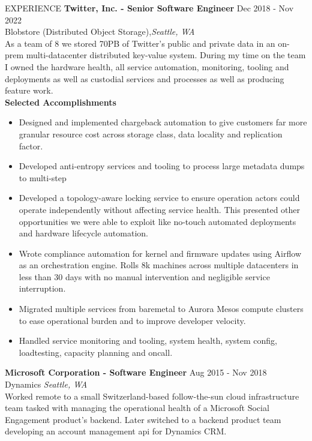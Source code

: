 \begin{rSection}{EXPERIENCE}
\textbf{Twitter, Inc. - Senior Software Engineer} \hfill Dec 2018 - Nov 2022\\
Blobstore (Distributed Object Storage),\hfill \textit{Seattle, WA}  \vspace{1em} \\
As a team of 8 we stored 70PB of Twitter's public and private data in an on-prem multi-datacenter distributed key-value system. During my time on the team I owned the hardware health, all service automation, monitoring, tooling and deployments as well as custodial services and processes as well as producing feature work.
\vspace{0.5em}\\
{\bf Selected Accomplishments}
 \begin{itemize}
    \itemsep -3pt {} 
     \item Designed and implemented chargeback automation to give customers far more granular resource cost across storage class, data locality and replication factor. 
     \item Developed anti-entropy services and tooling to process large metadata dumps to multi-step 
     \item Developed a topology-aware locking service to ensure operation actors could operate independently without affecting service health. This presented other opportunities we were able to exploit like no-touch automated deployments and hardware lifecycle automation.
     \item Wrote compliance automation for kernel and firmware updates using Airflow as an orchestration engine. Rolls 8k machines across multiple datacenters in less than 30 days with no manual intervention and negligible service interruption. 
     \item Migrated multiple services from baremetal to Aurora Mesos compute clusters to ease operational burden and to improve developer velocity.
     \item Handled service monitoring and tooling, system health, system config, loadtesting, capacity planning and oncall.
 \end{itemize}
\vspace{1em}
\textbf{Microsoft Corporation - Software Engineer} \hfill Aug 2015 - Nov 2018\\
Dynamics  \hfill \textit{Seattle, WA} \vspace{1em} \\
Worked remote to a small Switzerland-based follow-the-sun cloud infrastructure team tasked with managing the operational health of a Microsoft Social Engagement product's backend. Later switched to a backend product team developing an account management api for Dynamics CRM.\vspace{0.5em}
\end{rSection} 